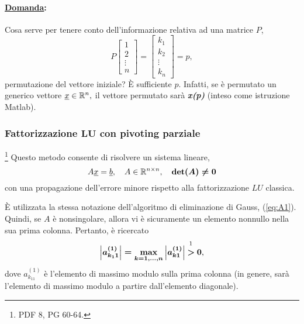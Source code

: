 \paragraph{\ul{Domanda}:}{Cosa serve per tenere conto dell'informazione relativa ad una matrice $P$,
\begin{equation*}
    P\begin{bmatrix}
        1\\
        2\\
        \vdots\\
        n
    \end{bmatrix} = 
    \begin{bmatrix}
        k_1\\
        k_2\\
        \vdots\\
        k_n
    \end{bmatrix} = p,
\end{equation*}
permutazione del vettore iniziale? È sufficiente $p$. Infatti, se è permutato un generico vettore $\uline x\in\mathbb R^n,$ il vettore permutato sarà \textbf{\textit{x(p)}} (inteso come istruzione Matlab).}

\subsubsection{Fattorizzazione \texorpdfstring{$\boldsymbol{LU}$}{LU} con pivoting parziale}\label{ssec:fattLUPivParz}\footnote{PDF 8, PG 60-64.}
Questo metodo consente di risolvere un sistema lineare,
\begin{equation*}
    A\uline x=\uline b, \quad A\in\mathbb R^{n \times n}, \quad \boldsymbol{\det(A)\neq 0}
\end{equation*}
con una propagazione dell'errore minore rispetto alla fattorizzazione $LU$ classica. %

È utilizzata la stessa notazione dell'algoritmo di eliminazione di Gauss, (\ref{eq:A1}). Quindi, se $A$ è nonsingolare, allora vi è sicuramente un elemento nonnullo nella sua prima colonna. Pertanto, è ricercato
\begin{equation*}
    \boldsymbol{\left|a_{k_11}^{(1)}\right|=\underset{k=1,\hdots,n}{\max}\left|a_{k1}^{(1)}\right|}\overset{\footnotemark}{\boldsymbol >}\boldsymbol 0,
\end{equation*}
dove $a_{k_11}^{(1)}$ è l'elemento di massimo modulo sulla prima colonna (in genere, sarà l'elemento di massimo modulo a partire dall'elemento diagonale).

